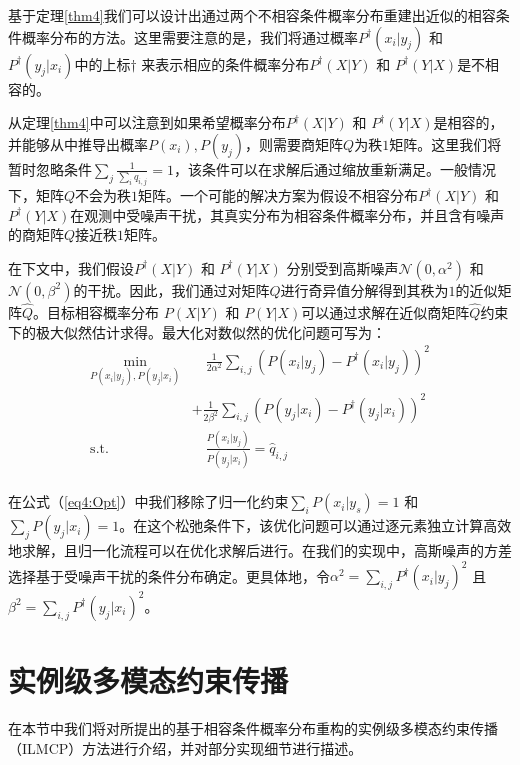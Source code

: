 基于定理\ref{thm4}我们可以设计出通过两个不相容条件概率分布重建出近似的相容条件概率分布的方法。这里需要注意的是，我们将通过概率$P^\dagger (x_i|y_j)$ 和 $P^\dagger (y_j|x_i)$中的上标$\dagger$ 来表示相应的条件概率分布$P^\dagger (X|Y)$ 和  $P^\dagger (Y|X)$是不相容的。

从定理\ref{thm4}中可以注意到如果希望概率分布$P^\dagger (X|Y)$ 和  $P^\dagger (Y|X)$是相容的，并能够从中推导出概率$P(x_i), P(y_j)$，则需要商矩阵$Q$为秩$1$矩阵。这里我们将暂时忽略条件$\sum_j\frac{1}{\sum_i {q}_{i,j}} = 1$，该条件可以在求解后通过缩放重新满足。一般情况下，矩阵$Q$不会为秩$1$矩阵。一个可能的解决方案为假设不相容分布$P^\dagger (X|Y)$ 和  $P^\dagger (Y|X)$在观测中受噪声干扰，其真实分布为相容条件概率分布，并且含有噪声的商矩阵$Q$接近秩$1$矩阵。

在下文中，我们假设$P^\dagger(X|Y)$ 和 $P^\dagger(Y|X)$ 分别受到高斯噪声$ \mathcal{N}(0, \alpha^2) $ 和  $ \mathcal{N}(0, \beta^2) $的干扰。因此，我们通过对矩阵$Q$进行奇异值分解得到其秩为$1$的近似矩阵$\hat{{Q}}$。目标相容概率分布 $P(X|Y)$ 和  $P(Y|X)$可以通过求解在近似商矩阵$\hat{{Q}}$约束下的极大似然估计求得。最大化对数似然的优化问题可写为：
\begin{equation}
\begin{split}
\mathop{\mathrm{min}}_{P(x_i|y_j), P(y_j|x_i)} & \quad \frac{1}{2 \alpha^2} \sum_{i,j}(P(x_i|y_j)-P^\dagger(x_i|y_j))^2 \\
&+ \frac{1}{2 \beta^2} \sum_{i,j}(P(y_j|x_i)-P^\dagger(y_j|x_i))^2\\
\mathrm{s.t.}\quad \quad \quad&\quad \frac{P(x_i|y_j)}{P(y_j|x_i)} = \hat{{q}}_{i,j}\\
\end{split}
\label{eq4:Opt}
\end{equation}

在公式（\ref{eq4:Opt}）中我们移除了归一化约束$\sum_{i}P(x_i|y_s) = 1$ 和  $\sum_{j}P(y_j|x_i) = 1$。在这个松弛条件下，该优化问题可以通过逐元素独立计算高效地求解，且归一化流程可以在优化求解后进行。在我们的实现中，高斯噪声的方差选择基于受噪声干扰的条件分布确定。更具体地，令$\alpha^2 = \sum_{i,j}P^\dagger(x_i|y_j)^2$ 且 $\beta^2 = \sum_{i,j}P^\dagger(y_j|x_i)^2$。

\section{实例级多模态约束传播}
在本节中我们将对所提出的基于相容条件概率分布重构的实例级多模态约束传播（ILMCP）方法进行介绍，并对部分实现细节进行描述。
